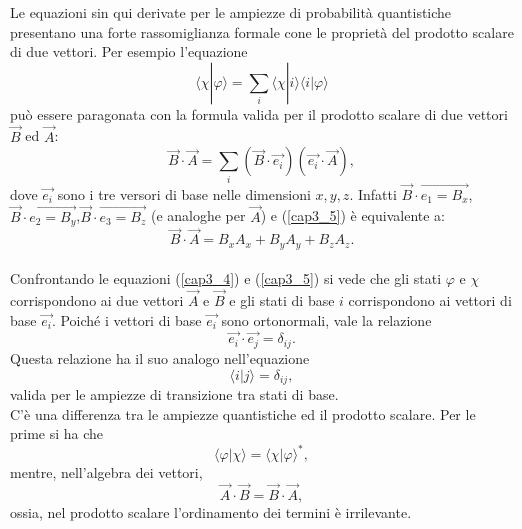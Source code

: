 \documentclass[a4paper,12pt,oneside]{book}
\begin{document}
Le equazioni sin qui derivate per le ampiezze di probabilità quantistiche presentano una forte rassomiglianza formale cone le proprietà del prodotto scalare di due vettori. Per esempio l'equazione
	\begin{equation}
		\langle \chi | \varphi \rangle =\sum \limits_{i}\langle \chi | i \rangle \langle i | \varphi \rangle
	\label{cap3_4}
	\end{equation}
può essere paragonata con la formula valida per il prodotto scalare di due vettori $\vec{B}$ ed $\vec{A}$:
	\begin{equation}
		\vec{B} \cdot \vec{A}= \sum \limits_{i} (\vec{B} \cdot  \vec{e_i})(\vec{e_i} \cdot \vec{A}) ,
	\label{cap3_5}
	\end{equation}
dove $\vec{e_i}$ sono i tre versori di base nelle dimensioni $x,y,z$. Infatti $\vec{B}\cdot \vec{e_1=B_x}$, $\vec{B}\cdot \vec{e_2=B_y}$,$\vec{B}\cdot \vec{e_3=B_z}$ (e analoghe per  $\vec{A}$) e (\eqref{cap3_5}) è equivalente a:
	\begin{equation}
		\vec{B} \cdot \vec{A} = B_xA_x+B_yA_y+B_zA_z .
	\end{equation}\\
	
Confrontando le equazioni (\ref{cap3_4}) e (\ref{cap3_5}) si vede che gli stati $\varphi$ e $\chi$ corrispondono ai due vettori $\vec{A}$ e $\vec{B}$ e gli stati di base $i$ corrispondono ai vettori di base $\vec{e_i}$. Poiché i vettori di base $\vec{e_i}$ sono ortonormali, vale la relazione
	\begin{equation}
		\vec{e_i} \cdot \vec{e_j}= \delta_{ij} .
	\end{equation}
Questa relazione ha il suo analogo nell'equazione
	\begin{equation}
		\langle i | j \rangle = \delta_{ij} ,
	\end{equation}
valida per le ampiezze di transizione tra stati di base.\\

C'è una differenza tra le ampiezze quantistiche ed il prodotto scalare. Per le prime si ha che
	\begin{equation}
		\langle \varphi | \chi \rangle = \langle \chi | \varphi\rangle ^* ,
	\label{cap3_6}
	\end{equation} 
mentre, nell'algebra dei vettori, 
	\begin{equation}
		\vec{A} \cdot \vec{B}= \vec{B} \cdot \vec{A} ,
	\label{cap3_7}
	\end{equation}
ossia, nel prodotto scalare l'ordinamento dei termini è irrilevante.\\
\end{document}
